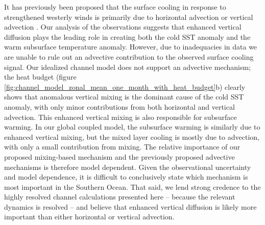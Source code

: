 \documentclass{ametsocV5}
\begin{document}
It has previously been proposed that the surface cooling in response to strengthened westerly winds is primarily due to horizontal advection \citep{Ferreira2015} or vertical advection \citep{Purich2016}. Our analysis of the observations suggests that enhanced vertical diffusion plays the leading role in creating both the cold SST anomaly and the warm subsurface temperature anomaly. However, due to inadequacies in data we are unable to rule out an advective contribution to the observed surface cooling signal. Our idealized channel model does not support an advective mechanism; the heat budget (figure \ref{fig:channel_model_zonal_mean_one_month_with_heat_budget}b) clearly shows that anomalous vertical mixing is the dominant cause of the cold SST anomaly, with only minor contributions from both horizontal and vertical advection. This enhanced vertical mixing is also responsible for subsurface warming. In our global coupled model, the subsurface warming is similarly due to enhanced vertical mixing, but the mixed layer cooling is mostly due to advection, with only a small contribution from mixing. The relative importance of our proposed mixing-based mechanism and the previously proposed advective mechanisms \citep{Ferreira2015,Purich2016} is therefore model dependent. Given the observational uncertainty and model dependence, it is difficult to conclusively state which mechanism is most important in the Southern Ocean. That said, we lend strong credence to the highly resolved channel calculations presented here -- because the relevant dynamics is resolved -- and believe that enhanced vertical diffusion is likely more important than either horizontal or vertical advection.

\end{document}
